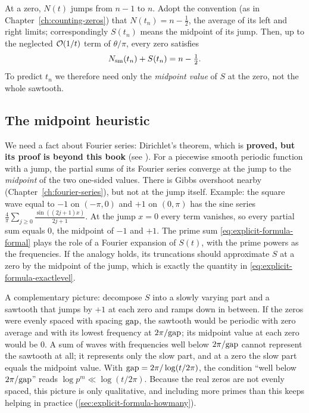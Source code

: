 At a zero, $N(t)$ jumps from $n-1$ to $n$. Adopt the convention (as in Chapter~\ref{ch:counting-zeros}) that $N(t_n)=n-\tfrac12$, the average of its left and right limits; correspondingly $S(t_n)$ means the midpoint of its jump. Then, up to the neglected $\mathcal{O}(1/t)$ term of $\theta/\pi$, every zero satisfies
\begin{equation}
N_{\mathrm{sm}}(t_n)+S(t_n)=n-\tfrac12 .
\label{eq:explicit-formula-exactlevel}
\end{equation}
To predict $t_n$ we therefore need only the \emph{midpoint value} of $S$ at the zero, not the whole sawtooth.

\subsection{The midpoint heuristic}

We need a fact about Fourier series: Dirichlet's theorem, which is \textbf{proved, but its proof is beyond this book} (see \cite{rhb}). For a piecewise smooth periodic function with a jump, the partial sums of its Fourier series converge at the jump to the \emph{midpoint} of the two one-sided values. There is Gibbs overshoot nearby (Chapter~\ref{ch:fourier-series}), but not at the jump itself. Example: the square wave equal to $-1$ on $(-\pi,0)$ and $+1$ on $(0,\pi)$ has the sine series $\frac4\pi\sum_{j\ge0}\frac{\sin((2j+1)x)}{2j+1}$. At the jump $x=0$ every term vanishes, so every partial sum equals $0$, the midpoint of $-1$ and $+1$. The prime sum \cref{eq:explicit-formula-formal} plays the role of a Fourier expansion of $S(t)$, with the prime powers as the frequencies. If the analogy holds, its truncations should approximate $S$ at a zero by the midpoint of the jump, which is exactly the quantity in \cref{eq:explicit-formula-exactlevel}.

A complementary picture: decompose $S$ into a slowly varying part and a sawtooth that jumps by $+1$ at each zero and ramps down in between. If the zeros were evenly spaced with spacing $\mathrm{gap}$, the sawtooth would be periodic with zero average and with its lowest frequency at $2\pi/\mathrm{gap}$; its midpoint value at each zero would be $0$. A sum of waves with frequencies well below $2\pi/\mathrm{gap}$ cannot represent the sawtooth at all; it represents only the slow part, and at a zero the slow part equals the midpoint value. With $\mathrm{gap}=2\pi/\log(t/2\pi)$, the condition ``well below $2\pi/\mathrm{gap}$'' reads $\log p^m\ll\log(t/2\pi)$. Because the real zeros are not evenly spaced, this picture is only qualitative, and including more primes than this keeps helping in practice (\cref{sec:explicit-formula-howmany}).

